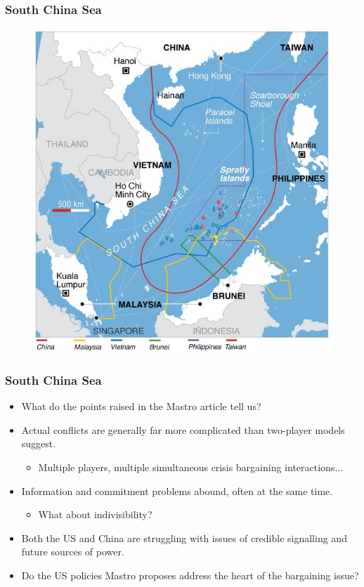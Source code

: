 \documentclass[handout]{beamer}
\begin{document}
\begin{frame} 
	\frametitle{\LARGE{South China Sea}}
	\begin{figure}[ht!]
		\centering
		\includegraphics[width=\textwidth,height=0.8\textheight,keepaspectratio]{South_China_Sea_claims_map.jpg}
	\end{figure}
\end{frame}

\begin{frame} 
	\frametitle{\LARGE{South China Sea}}
	\begin{itemize}
		\item What do the points raised in the Mastro article tell us? \pause
		\item Actual conflicts are generally far more complicated than two-player models suggest. \pause
		\begin{itemize}
			\item Multiple players, multiple simultaneous crisis bargaining interactions... \pause
		\end{itemize}
		\item Information and commitment problems abound, often at the same time. \pause  
		\begin{itemize}
			\item What about indivisibility? \pause
		\end{itemize}
		\item Both the US and China are struggling with issues of credible signalling and future sources of power. \pause 
		\item Do the US policies Mastro proposes address the heart of the bargaining issue? 
	\end{itemize}
\end{frame}
\end{document}
